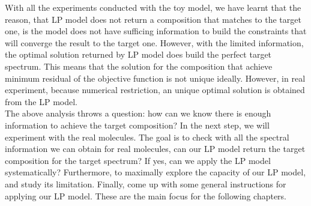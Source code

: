 With all the experiments conducted with the toy model, we have learnt that the reason, that LP model does not return a composition that matches to the target one, is the model does not have sufficing information to build the constraints that will converge the result to the target one. However, with the limited information, the optimal solution returned by LP model does build the perfect target spectrum. This means that the solution for the composition that achieve minimum residual of the objective function is not unique ideally. However, in real experiment, because numerical restriction, an unique optimal solution is obtained from the LP model. \\

The above analysis throws a question: how can we know there is enough information to achieve the target composition? In the next step, we will experiment with the real molecules. The goal is to check with all the spectral information we can obtain for real molecules, can our LP model return the target composition for the target spectrum? If yes, can we apply the LP model systematically? Furthermore, to maximally explore the capacity of our LP model, and study its limitation. Finally, come up with some general instructions for applying our LP model. These are the main focus for the following chapters.\\

		

		 



